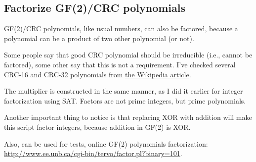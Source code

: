 \subsection{Factorize GF(2)/CRC polynomials}

GF(2)/CRC polynomials, like usual numbers, can also be factored, because a polynomial can be a product of two other polynomial (or not).

Some people say that good CRC polynomial should be irreducible (i.e., cannot be factored), some other say that this is not a requirement.
I've checked several CRC-16 and CRC-32 polynomials from \href{https://en.wikipedia.org/wiki/Cyclic_redundancy_check}{the Wikipedia article}.

The multiplier is constructed in the same manner, as I did it earlier for integer factorization using SAT.
Factors are not prime integers, but prime polynomials.

Another important thing to notice is that replacing XOR with addition will make this script factor integers, because addition in GF(2) is XOR.

Also, can be used for tests, online GF(2) polynomials factorization: \url{http://www.ee.unb.ca/cgi-bin/tervo/factor.pl?binary=101}.



